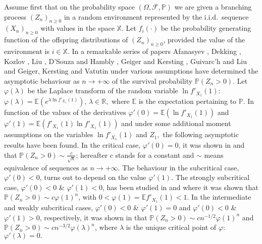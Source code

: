 \documentclass[12pt]{amsart}
\theoremstyle{definition}
\numberwithin{equation}{section}
\def\bb#1{\mathbb{#1}}
\def\scr#1{\mathscr{#1}}
\def\geq{\geqslant}
\def\phi{\varphi}
\renewcommand\ll{\lambda}
\begin{document}
Assume first that on the probability space  $\left( \Omega, \scr F, \bb P \right)$
we are given a branching process $\left( Z_n \right)_{n\geq 0}$ in a random environment 
represented by the i.i.d.\ sequence $\left( X_n \right)_{n\geq 0}$ with values in the space $\mathbb X.$ 
Let $f_i(\cdot)$ be the probability generating function of the offspring distributions of $\left( Z_n \right)_{n\geq 0}$, 
provided the value of the environment is $i\in \mathbb X.$
In a remarkable series of papers
Afanasyev \cite{afanasyev_limit_2009}, Dekking \cite{dekking_survival_1987}, Kozlov \cite{kozlov_asymptotic_1977},  
Liu \cite{liu1996survival},
D'Souza and Hambly \cite{dsouza_survival_1997}, 
Geiger and Kersting \cite{geiger_survival_2001}, 
Guivarc'h and Liu \cite{guivarch_proprietes_2001} 
and Geiger, Kersting and Vatutin \cite{geiger_limit_2003}
under various assumptions 
have determined the asymptotic behaviour as $n\to+\infty$ of the survival probability $\mathbb P (Z_n>0)$.
Let $\phi(\lambda)$ be the Laplace transform of the random variable $\ln f'_{X_1}(1)$:
$\phi(\ll)=\bb E \left(e^{\ll \ln f'_{X_1}(1)} \right)$, $\ll \in \bb R,$
where $\mathbb E$ is the expectation pertaining to $\mathbb P$. 
In function of the values of the derivatives 
$\phi'(0)=\mathbb E(\ln f'_{X_1}(1))$ and $\phi'(1)=\mathbb E(f'_{X_1}(1)\ln f'_{X_1}(1))$ 
and under some additional moment assumptions on the variables $\ln f'_{X_1}(1)$ and $Z_1,$
the following asymptotic results have been found. 
In the critical case, $\phi'(0)=0$, it was shown in \cite{kozlov_asymptotic_1977} and \cite{geiger_survival_2001} that  
$\mathbb P (Z_n>0)\sim \frac{c}{\sqrt{n}}$; 
hereafter $c$ stands for a constant and $\sim$ means equivalence of sequences as $n\to +\infty.$ 
The behaviour in the subcritical case, $\phi'(0)<0$, turns out to depend on the value $\phi'(1)$. 
The strongly subcritical case, $\phi'(0)<0$ \& $\phi'(1)<0$, has been studied in \cite{dsouza_survival_1997} and \cite{guivarch_proprietes_2001}
where it was shown that 
$\mathbb P (Z_n>0) \sim c \phi(1)^n$,
with $0< \phi(1)=\mathbb E f'_{X_1}(1)<1$. 
In the intermediate and weakly subcritical cases, $\phi'(0)<0$ \& $\phi'(1)=0$ and $\phi'(0)<0$ \& $\phi'(1)>0$, respectively, it was shown in   
\cite{geiger_limit_2003} that 
$\mathbb P (Z_n>0)\sim c n^{-1/2} \phi(1)^n$
and
$\mathbb P (Z_n>0)\sim c n^{-3/2}\phi(\ll)^n$, 
where $\ll$ is the unique critical point of $\phi$: $\phi'(\ll)=0.$
\end{document}
